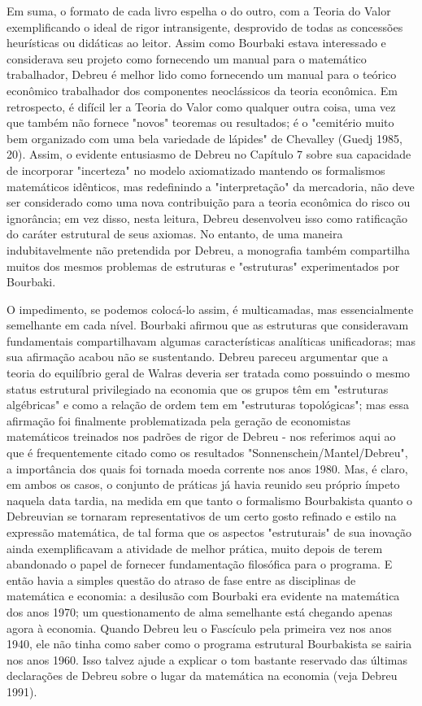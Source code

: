 \documentclass[a4paper,12pt]{article}[abntex2]
\begin{document}
Em suma, o formato de cada livro espelha o do outro, com a Teoria do Valor exemplificando o ideal de rigor intransigente, desprovido de todas as concessões heurísticas ou didáticas ao leitor. Assim como Bourbaki estava interessado e considerava seu projeto como fornecendo um manual para o matemático trabalhador, Debreu é melhor lido como fornecendo um manual para o teórico econômico trabalhador dos componentes neoclássicos da teoria econômica. Em retrospecto, é difícil ler a Teoria do Valor como qualquer outra coisa, uma vez que também não fornece "novos" teoremas ou resultados; é o "cemitério muito bem organizado com uma bela variedade de lápides" de Chevalley (Guedj 1985, 20). Assim, o evidente entusiasmo de Debreu no Capítulo 7 sobre sua capacidade de incorporar "incerteza" no modelo axiomatizado mantendo os formalismos matemáticos idênticos, mas redefinindo a "interpretação" da mercadoria, não deve ser considerado como uma nova contribuição para a teoria econômica do risco ou ignorância; em vez disso, nesta leitura, Debreu desenvolveu isso como ratificação do caráter estrutural de seus axiomas. No entanto, de uma maneira indubitavelmente não pretendida por Debreu, a monografia também compartilha muitos dos mesmos problemas de estruturas e "estruturas" experimentados por Bourbaki.

O impedimento, se podemos colocá-lo assim, é multicamadas, mas essencialmente semelhante em cada nível. Bourbaki afirmou que as estruturas que consideravam fundamentais compartilhavam algumas características analíticas unificadoras; mas sua afirmação acabou não se sustentando. Debreu pareceu argumentar que a teoria do equilíbrio geral de Walras deveria ser tratada como possuindo o mesmo status estrutural privilegiado na economia que os grupos têm em "estruturas algébricas" e como a relação de ordem tem em "estruturas topológicas"; mas essa afirmação foi finalmente problematizada pela geração de economistas matemáticos treinados nos padrões de rigor de Debreu - nos referimos aqui ao que é frequentemente citado como os resultados "Sonnenschein/Mantel/Debreu", a importância dos quais foi tornada moeda corrente nos anos 1980. Mas, é claro, em ambos os casos, o conjunto de práticas já havia reunido seu próprio ímpeto naquela data tardia, na medida em que tanto o formalismo Bourbakista quanto o Debreuvian se tornaram representativos de um certo gosto refinado e estilo na expressão matemática, de tal forma que os aspectos "estruturais" de sua inovação ainda exemplificavam a atividade de melhor prática, muito depois de terem abandonado o papel de fornecer fundamentação filosófica para o programa. E então havia a simples questão do atraso de fase entre as disciplinas de matemática e economia: a desilusão com Bourbaki era evidente na matemática dos anos 1970; um questionamento de alma semelhante está chegando apenas agora à economia. Quando Debreu leu o Fascículo pela primeira vez nos anos 1940, ele não tinha como saber como o programa estrutural Bourbakista se sairia nos anos 1960. Isso talvez ajude a explicar o tom bastante reservado das últimas declarações de Debreu sobre o lugar da matemática na economia (veja Debreu 1991).
\end{document}
